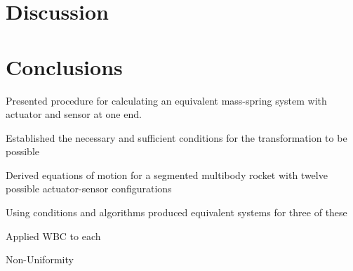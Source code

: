 \documentclass{mbd_fullpaper}
\begin{document}
\section{Discussion}
\label{sec:discussion}

\section{Conclusions}
\label{sec:conclusions}

Presented procedure for calculating an equivalent mass-spring system with actuator and sensor at one end.

Established the necessary and sufficient conditions for the transformation to be possible

Derived equations of motion for a segmented multibody rocket with twelve possible actuator-sensor configurations

Using conditions and algorithms produced equivalent systems for three of these

Applied WBC to each

Non-Uniformity



\end{document}
